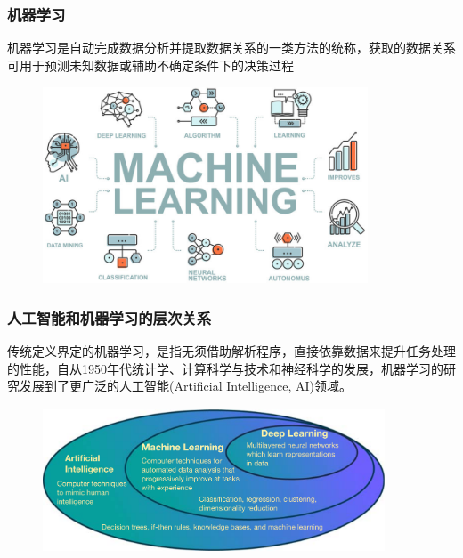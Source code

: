 \frame
{
	\frametitle{机器学习}
机器学习是自动完成数据分析并提取数据关系的一类方法的统称，获取的数据关系可用于预测未知数据或辅助不确定条件下的决策过程
\begin{figure}[h!]
\centering
\vspace*{-0.1in}
\includegraphics[height=2.3in,width=3.8in,viewport=0 0 630 390,clip]{Figures/Machine_Learning.jpg}
\label{Machine-Learning}
\end{figure}
}

\frame
{
	\frametitle{人工智能和机器学习的层次关系}
传统定义界定的机器学习，是指无须借助解析程序，直接依靠数据来提升任务处理的性能，自从1950年代统计学、计算科学与技术和神经科学的发展，机器学习的研究发展到了更广泛的人工智能\textrm{(Artificial Intelligence, AI)}领域。%
\begin{figure}[h!]
\centering
\vspace*{-0.1in}
\includegraphics[height=1.7in,width=4.0in,viewport=0 0 1275 550,clip]{Figures/Hierarchical_description_AI_ML_DL.png}
\caption{\fontsize{7.2pt}{4.2pt}}%
\label{AI-ML}
\end{figure}
}

